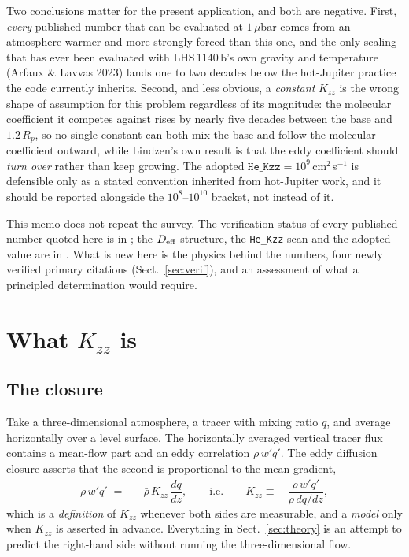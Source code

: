 \documentclass[english,a4paper]{my_memo}
\begin{document}
Two conclusions matter for the present application, and both are negative.
First, \emph{every} published number that can be evaluated at $1\,\mu$bar
comes from an atmosphere warmer and more strongly forced than this one, and
the only scaling that has ever been evaluated with LHS\,1140\,b's own
gravity and temperature (Arfaux \& Lavvas 2023) lands one to two decades
below the hot-Jupiter practice the code currently inherits. Second, and
less obvious, a \emph{constant} $K_{zz}$ is the wrong shape of assumption
for this problem regardless of its magnitude: the molecular coefficient it
competes against rises by nearly five decades between the base and
$1.2\,R_p$, so no single constant can both mix the base and follow the
molecular coefficient outward, while Lindzen's own result is that the eddy
coefficient should \emph{turn over} rather than keep growing. The adopted
$\texttt{He\_Kzz} = 10^{9}$\,cm$^{2}$\,s$^{-1}$ is defensible only as a
stated convention inherited from hot-Jupiter work, and it should be
reported alongside the $10^{8}$--$10^{10}$ bracket, not instead of it.

\medskip
\noindent This memo does not repeat the survey. The verification status of
every published number quoted here is in
; the $D_{\rm eff}$ structure, the
\texttt{He\_Kzz} scan and the adopted value are in
. What is new here is the physics behind the numbers,
four newly verified primary citations (Sect.~\ref{sec:verif}), and an
assessment of what a principled determination would require.

\section{What $K_{zz}$ is}
\label{sec:what}

\subsection{The closure}

Take a three-dimensional atmosphere, a tracer with mixing ratio $q$, and
average horizontally over a level surface. The horizontally averaged
vertical tracer flux contains a mean-flow part and an eddy correlation
$\overline{\rho\,w'q'}$. The eddy diffusion closure asserts that the second
is proportional to the mean gradient,
%
\begin{equation}
  \overline{\rho\,w'q'} \;=\; -\,\bar\rho\,K_{zz}\,\frac{d\bar q}{dz},
  \qquad\text{i.e.}\qquad
  K_{zz} \equiv -\,\frac{\overline{\rho\,w'q'}}{\bar\rho\,d\bar q/dz},
  \label{eq:def}
\end{equation}
%
which is a \emph{definition} of $K_{zz}$ whenever both sides are measurable,
and a \emph{model} only when $K_{zz}$ is asserted in advance. Everything in
Sect.~\ref{sec:theory} is an attempt to predict the right-hand side without
running the three-dimensional flow.
\end{document}
